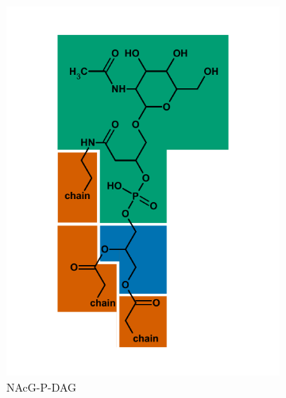 \newpage
\begin{figure}[h]\ContinuedFloat

    \begin{subfigure}[b]{.3\linewidth}
    	\includegraphics[width=\linewidth]{figs_ch1/NAcG-P-DAG}
    	\caption{NAcG-P-DAG}
        \label{fig:NAcG-P-DAG}
    \end{subfigure}
    \begin{subfigure}[b]{.3\linewidth}

\end{subfigure}
\end{figure}
